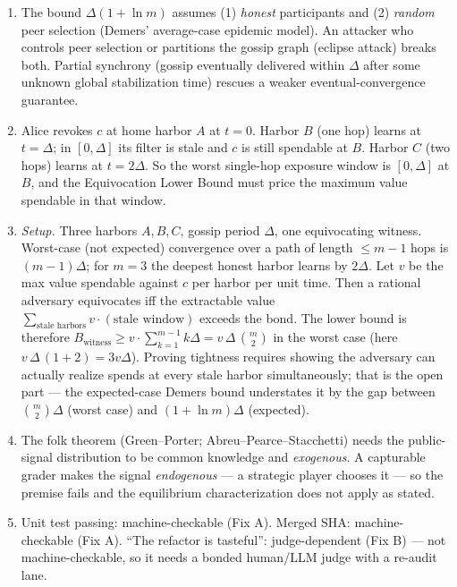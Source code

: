 \begin{enumerate}[label=\textbf{IV.\arabic*},leftmargin=2.8em,itemsep=8pt,topsep=4pt]
\item \wbcheck The bound $\Delta(1+\ln m)$ assumes (1) \emph{honest} participants and
  (2) \emph{random} peer selection (Demers' average-case epidemic model). An attacker
  who controls peer selection or partitions the gossip graph (eclipse attack) breaks
  both. Partial synchrony (gossip eventually delivered within $\Delta$ after some
  unknown global stabilization time) rescues a weaker eventual-convergence guarantee.

\item \wbtrace Alice revokes $c$ at home harbor $A$ at $t=0$. Harbor $B$ (one hop)
  learns at $t=\Delta$; in $[0,\Delta]$ its filter is stale and $c$ is still spendable
  at $B$. Harbor $C$ (two hops) learns at $t=2\Delta$. So the worst single-hop
  exposure window is $[0,\Delta]$ at $B$, and the Equivocation Lower Bound must price
  the maximum value spendable in that window.

\item \wbopen\wbstar \emph{Setup.} Three harbors $A,B,C$, gossip period $\Delta$,
  one equivocating witness. Worst-case (not expected) convergence over a path of
  length $\le m-1$ hops is $(m-1)\Delta$; for $m=3$ the deepest honest harbor learns
  by $2\Delta$. Let $v$ be the max value spendable against $c$ per harbor per unit
  time. Then a rational adversary equivocates iff the extractable value
  $\sum_{\text{stale harbors}} v\cdot(\text{stale window})$ exceeds the bond. The
  lower bound is therefore $B_{\text{witness}} \ge v\cdot\sum_{k=1}^{m-1}k\Delta
  = v\,\Delta\,\binom{m}{2}$ in the worst case (here $v\,\Delta\,(1+2)=3v\Delta$).
  Proving tightness requires showing the adversary can actually realize spends at
  every stale harbor simultaneously; that is the open part --- the expected-case
  Demers bound understates it by the gap between $\binom{m}{2}\Delta$ (worst case) and
  $(1+\ln m)\Delta$ (expected).

\item \wbcheck The folk theorem (Green--Porter; Abreu--Pearce--Stacchetti) needs the
  public-signal distribution to be common knowledge and \emph{exogenous}. A capturable
  grader makes the signal \emph{endogenous} --- a strategic player chooses it --- so
  the premise fails and the equilibrium characterization does not apply as stated.

\item \wbcheck Unit test passing: machine-checkable (Fix A). Merged SHA:
  machine-checkable (Fix A). ``The refactor is tasteful'': judge-dependent (Fix B) ---
  not machine-checkable, so it needs a bonded human/LLM judge with a re-audit lane.


\end{enumerate}
